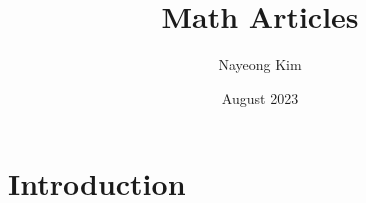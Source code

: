 \documentclass{article}
\title{Math Articles}
\author{Nayeong Kim}
\date{August 2023}
\begin{document}
\maketitle

\section{Introduction}
\end{document}
